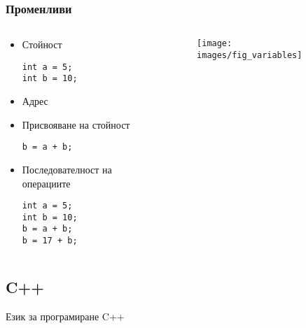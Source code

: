 \documentclass{beamer}
\begin{document}
\begin{frame}[fragile]
\frametitle{Променливи}


\begin{columns}[t]
  \begin{column}{0.7\textwidth}

\begin{itemize}
\item Стойност
\begin{lstlisting}
int a = 5;
int b = 10;
\end{lstlisting}
\item Адрес
\item Присвояване на стойност
\begin{lstlisting}
b = a + b;
\end{lstlisting}
\item Последователност на операциите
\begin{lstlisting}
int a = 5;
int b = 10;
b = a + b;
b = 17 + b;
\end{lstlisting}
\end{itemize}

  \end{column}



  \begin{column}{0.4\textwidth}
\begin{figure}
\texttt{[image: images/fig\_variables]}
\end{figure}
  \end{column}
\end{columns}

\end{frame}

\subsection{C++}

\begin{frame}
\centerline{Език за програмиране C++}
\end{frame}
\end{document}
